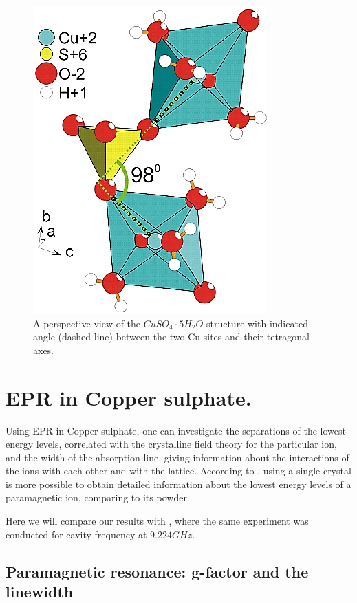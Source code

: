 \documentclass[openany,11pt,a4paper]{report}
\begin{document}
\begin{figure}[H]
\centering
\includegraphics[scale=0.6]{cry.PNG}
\caption{A perspective view of the $CuSO_{4}\cdot 5H_{2}O$ structure with indicated angle (dashed
line) between the two Cu sites and their tetragonal axes. \cite{crystalepr}}
\end{figure}





\section{EPR in Copper sulphate.}

Using EPR in Copper sulphate, one can investigate  the separations of the lowest energy levels, correlated with the crystalline field theory for the particular ion, and the width of the absorption
line, giving information about the interactions of the ions with each other and with the lattice.
According to \cite{general}, using a single crystal  is more possible to obtain detailed information about the lowest energy levels of a paramagnetic ion, comparing to its powder.




Here we will compare our results with \cite{3.25sos}, where the same experiment was conducted for cavity frequency at $9.224 GHz$.


\subsection{Paramagnetic resonance: g-factor and the linewidth}  
\end{document}
